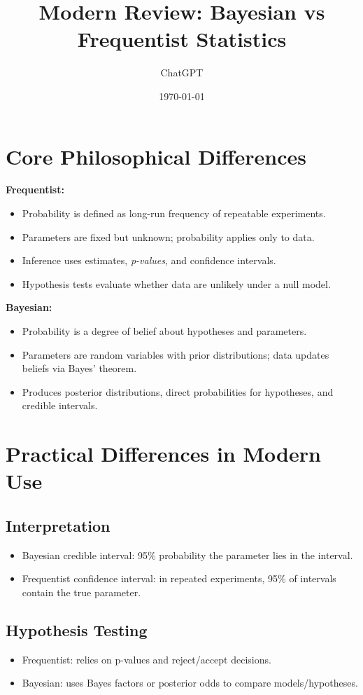 \documentclass[12pt]{article}
\title{Modern Review: Bayesian vs Frequentist Statistics}
\author{ ChatGPT }
\date{\today}
\begin{document}
\maketitle

\section{Core Philosophical Differences}

\textbf{Frequentist:}
\begin{itemize}
    \item Probability is defined as long-run frequency of repeatable experiments.
    \item Parameters are fixed but unknown; probability applies only to data.
    \item Inference uses estimates, \textit{p-values}, and confidence intervals.
    \item Hypothesis tests evaluate whether data are unlikely under a null model.
\end{itemize}

\textbf{Bayesian:}
\begin{itemize}
    \item Probability is a degree of belief about hypotheses and parameters.
    \item Parameters are random variables with prior distributions; data updates beliefs via Bayes' theorem.
    \item Produces posterior distributions, direct probabilities for hypotheses, and credible intervals.
\end{itemize}

\section{Practical Differences in Modern Use}

\subsection{Interpretation}
\begin{itemize}
    \item Bayesian credible interval: 95\% probability the parameter lies in the interval.
    \item Frequentist confidence interval: in repeated experiments, 95\% of intervals contain the true parameter.
\end{itemize}

\subsection{Hypothesis Testing}
\begin{itemize}
    \item Frequentist: relies on p-values and reject/accept decisions.
    \item Bayesian: uses Bayes factors or posterior odds to compare models/hypotheses.
\end{itemize}
\end{document}
